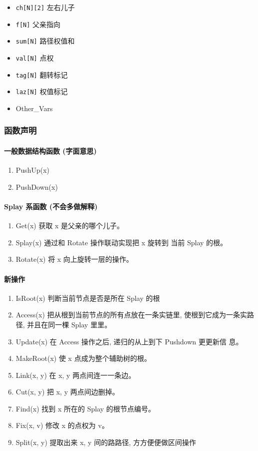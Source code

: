 \begin{itemize}
\item \texttt{ch[N][2]} 左右⼉子 
\item \texttt{f[N]} ⽗亲指向
\item \texttt{sum[N]} 路径权值和 
\item \texttt{val[N]} 点权
\item \texttt{tag[N]} 翻转标记
\item \texttt{laz[N]} 权值标记 
\item Other\_Vars
\end{itemize}

\subsubsection{函数声明}

\paragraph{⼀般数据结构函数 (字面意思)}

\begin{enumerate}
\item PushUp(x)
\item PushDown(x)
\end{enumerate}

\paragraph{Splay 系函数 (不会多做解释)}

\begin{enumerate}
\item Get(x) 获取 x 是父亲的哪个⼉子。
\item Splay(x) 通过和 Rotate 操作联动实现把 x 旋转到 当前 Splay 的根。 
\item Rotate(x) 将 x 向上旋转一层的操作。
\end{enumerate}

\paragraph{新操作}

\begin{enumerate}
\item IsRoot(x) 判断当前节点是否是所在 Splay 的根
\item Access(x) 把从根到当前节点的所有点放在⼀条实链里, 使根到它成为一条实路径, 并且在同一棵 Splay 里里。
\item Update(x) 在 Access 操作之后, 递归的从上到下 Pushdown 更更新信 息。
\item MakeRoot(x) 使 x 点成为整个辅助树的根。
\item Link(x, y) 在 x, y 两点间连⼀一条边。
\item Cut(x, y) 把 x, y 两点间边删掉。
\item Find(x) 找到 x 所在的 Splay 的根节点编号。
\item Fix(x, v) 修改 x 的点权为 v。
\item Split(x, y) 提取出来 x, y 间的路路径, ⽅方便便做区间操作
\end{enumerate}

